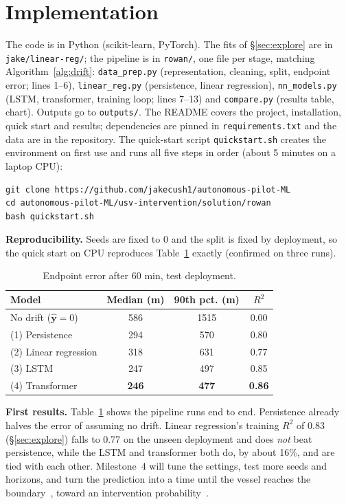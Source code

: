 \documentclass[sigconf]{acmart}
\begin{document}
\section{Implementation}\label{sec:impl}
The code is in Python (scikit-learn, PyTorch). The fits of \S\ref{sec:explore} are in \texttt{jake/linear-reg/}; the pipeline is in \texttt{rowan/}, one file per stage, matching Algorithm~\ref{alg:drift}: \texttt{data\_prep.py} (representation, cleaning, split, endpoint error; lines 1--6), \texttt{linear\_reg.py} (persistence, linear regression), \texttt{nn\_models.py} (LSTM, transformer, training loop; lines 7--13) and \texttt{compare.py} (results table, chart). Outputs go to \texttt{outputs/}. The README covers the project, installation, quick start and results; dependencies are pinned in \texttt{requirements.txt} and the data are in the repository. The quick-start script \texttt{quickstart.sh} creates the environment on first use and runs all five steps in order (about 5 minutes on a laptop CPU):
{\footnotesize
\begin{verbatim}
git clone https://github.com/jakecush1/autonomous-pilot-ML
cd autonomous-pilot-ML/usv-intervention/solution/rowan
bash quickstart.sh
\end{verbatim}}
\textbf{Reproducibility.} Seeds are fixed to 0 and the split is fixed by deployment, so the quick start on CPU reproduces Table~\ref{tab:results} exactly (confirmed on three runs).

\begin{table}[t]
\caption{Endpoint error after 60 min, test deployment.}
\label{tab:results}
\footnotesize
\begin{tabular}{@{}lccc@{}}
\toprule
Model & Median (m) & 90th pct. (m) & $R^2$ \\
\midrule
No drift ($\hat{\mathbf{y}}=0$) & 586 & 1515 & 0.00 \\
(1) Persistence & 294 & 570 & 0.80 \\
(2) Linear regression & 318 & 631 & 0.77 \\
(3) LSTM & 247 & 497 & 0.85 \\
(4) Transformer & \textbf{246} & \textbf{477} & \textbf{0.86} \\
\bottomrule
\end{tabular}
\end{table}

\textbf{First results.} Table~\ref{tab:results} shows the pipeline runs end to end. Persistence already halves the error of assuming no drift. Linear regression's training $R^2$ of 0.83 (\S\ref{sec:explore}) falls to 0.77 on the unseen deployment and does \emph{not} beat persistence, while the LSTM and transformer both do, by about 16\%, and are tied with each other. Milestone~4 will tune the settings, test more seeds and horizons, and turn the prediction into a time until the vessel reaches the boundary~\cite{dugan2024drifting}, toward an intervention probability~\cite{kristensen2022dynamic}.



\end{document}
